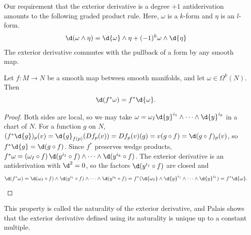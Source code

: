\documentclass[a4paper,12pt]{article}
\begin{document}
Our requirement that the exterior derivative is a degree $+1$ antiderivation amounts to the following graded product rule.
Here, $\omega$ is a $k$-form and $\eta$ is an $l$-form.
\begin{equation}
    \d(\omega \wedge \eta) = \d{\omega} \wedge \eta + (-1)^k \omega \wedge \d{\eta}
\end{equation}
The exterior derivative commutes with the pullback of a form by any smooth map.
\begin{proposition}\label{prop:naturality_of_exterior_derivative}
    Let $f \colon M \to N$ be a smooth map between smooth manifolds, and let $\omega \in \Omega^k(N)$.
    Then
    \begin{equation}
        \d(f^*\omega) = f^*\d{\omega}.
    \end{equation}
\end{proposition}
\begin{proof}
    Both sides are local, so we may take $\omega = \omega_I \d{y}^{i_1} \wedge \cdots \wedge \d{y}^{i_k}$ in a chart of $N$.
    For a function $g$ on $N$, $(f^*\d{g})_p(v) = \d{g}_{f(p)}(Df_p(v)) = Df_p(v)(g) = v(g \circ f) = \d(g \circ f)_p(v)$, so $f^*\d{g} = \d(g \circ f)$.
    Since $f^*$ preserves wedge products, $f^*\omega = (\omega_I \circ f) \, \d(y^{i_1} \circ f) \wedge \cdots \wedge \d(y^{i_k} \circ f)$.
    The exterior derivative is an antiderivation with $\d^2 = 0$, so the factors $\d(y^{i_j} \circ f)$ are closed and
    \begin{equation*}
        \d(f^*\omega) = \d(\omega_I \circ f) \wedge \d(y^{i_1} \circ f) \wedge \cdots \wedge \d(y^{i_k} \circ f) = f^*(\d{\omega_I} \wedge \d{y}^{i_1} \wedge \cdots \wedge \d{y}^{i_k}) = f^*\d{\omega}. \qedhere
    \end{equation*}
\end{proof}
This property is called the naturality of the exterior derivative, and Palais \cite{palais1959natural} shows that the exterior derivative defined using its naturality is unique up to a constant multiple.
\end{document}

